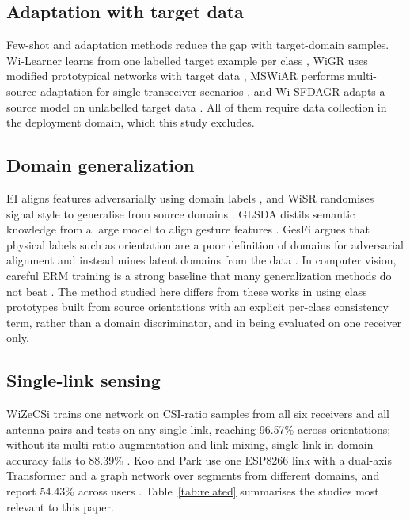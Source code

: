 \documentclass[conference]{IEEEtran}
\begin{document}
\subsection{Adaptation with target data}
Few-shot and adaptation methods reduce the gap with target-domain samples. Wi-Learner learns from one labelled target example per class \cite{feng2022wilearner}, WiGR uses modified prototypical networks with target data \cite{zhang2022wigr}, MSWiAR performs multi-source adaptation for single-transceiver scenarios \cite{jiao2025mswiar}, and Wi-SFDAGR adapts a source model on unlabelled target data \cite{yan2025wisfdagr}. All of them require data collection in the deployment domain, which this study excludes.

\subsection{Domain generalization}
EI aligns features adversarially using domain labels \cite{jiang2018ei}, and WiSR randomises signal style to generalise from source domains \cite{liu2023wisr}. GLSDA distils semantic knowledge from a large model to align gesture features \cite{cui2025glsda}. GesFi argues that physical labels such as orientation are a poor definition of domains for adversarial alignment and instead mines latent domains from the data \cite{zhang2026gesfi}. In computer vision, careful ERM training is a strong baseline that many generalization methods do not beat \cite{gulrajani2021lost}. The method studied here differs from these works in using class prototypes built from source orientations with an explicit per-class consistency term, rather than a domain discriminator, and in being evaluated on one receiver only.

\subsection{Single-link sensing}
WiZeCSi trains one network on CSI-ratio samples from all six receivers and all antenna pairs and tests on any single link, reaching 96.57\% across orientations; without its multi-ratio augmentation and link mixing, single-link in-domain accuracy falls to 88.39\% \cite{dai2026wizecsi}. Koo and Park use one ESP8266 link with a dual-axis Transformer and a graph network over segments from different domains, and report 54.43\% across users \cite{koo2026dualaxis}. Table~\ref{tab:related} summarises the studies most relevant to this paper.
\end{document}
